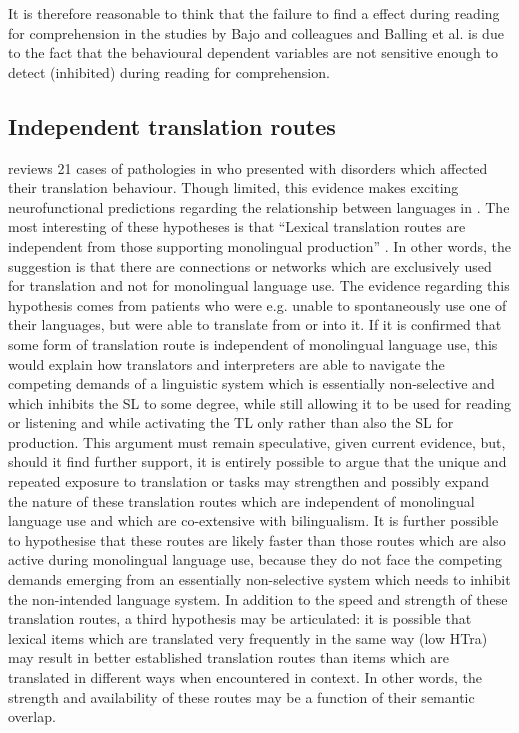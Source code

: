 \documentclass[output=paper]{LSP/langsci}
\begin{document}
It is therefore reasonable to think that the failure to find a  effect during reading for comprehension in the studies by Bajo and colleagues and Balling et al. is due to the fact that the behavioural dependent variables are not sensitive enough to detect (inhibited)  during reading for comprehension.

\subsection{Independent translation routes}

\citet{Garcia2015a} reviews 21 cases of pathologies in  who presented with disorders which affected their translation behaviour. Though limited, this evidence makes exciting neurofunctional predictions regarding the relationship between languages in . The most interesting of these hypotheses is that ``Lexical translation routes are independent from those supporting monolingual production'' \citep[131]{Garcia2015a}. In other words, the suggestion is that there are connections or networks which are exclusively used for translation and not for monolingual language use. The evidence regarding this hypothesis comes from patients who were e.g. unable to spontaneously use one of their languages, but were able to translate from or into it. If it is confirmed that some form of translation route is independent of monolingual language use, this would explain how translators and interpreters are able to navigate the competing demands of a linguistic system which is essentially non-selective and which inhibits the SL to some degree, while still allowing it to be used for reading or listening and while activating the TL only rather than also the SL for production. This argument must remain speculative, given current evidence, but, should it find further support, it is entirely possible to argue that the unique and repeated exposure to translation or  tasks may strengthen and possibly expand the nature of these translation routes which are independent of monolingual language use and which are co-extensive with bilingualism. It is further possible to hypothesise that these routes are likely faster than those routes which are also active during monolingual language use, because they do not face the competing demands emerging from an essentially non-selective system which needs to inhibit the non-intended language system. In addition to the speed and strength of these translation routes, a third hypothesis may be articulated: it is possible that lexical items which are translated very frequently in the same way (low HTra) may result in better established translation routes than items which are translated in different ways when encountered in context. In other words, the strength and availability of these routes may be a function of their semantic overlap.
\end{document}
